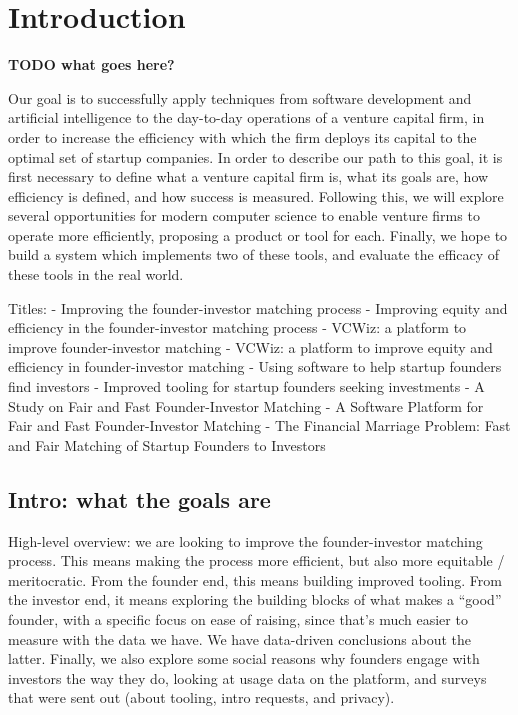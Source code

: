 \chapter{Introduction}

\textbf{TODO what goes here?}

Our goal is to successfully apply techniques from software development and artificial intelligence to the day-to-day operations of a venture capital firm, in order to increase the efficiency with which the firm deploys its capital to the optimal set of startup companies. In order to describe our path to this goal, it is first necessary to define what a venture capital firm is, what its goals are, how efficiency is defined, and how success is measured. Following this, we will explore several opportunities for modern computer science to enable venture firms to operate more efficiently, proposing a product or tool for each. Finally, we hope to build a system which implements two of these tools, and evaluate the efficacy of these tools in the real world.


Titles:
  - Improving the founder-investor matching process
  - Improving equity and efficiency in the founder-investor matching process
  - VCWiz: a platform to improve founder-investor matching
  - VCWiz: a platform to improve equity and efficiency in founder-investor matching
  - Using software to help startup founders find investors
  - Improved tooling for startup founders seeking investments
  - A Study on Fair and Fast Founder-Investor Matching
  - A Software Platform for Fair and Fast Founder-Investor Matching
  - The Financial Marriage Problem: Fast and Fair Matching of Startup Founders to Investors

\section{Intro: what the goals are}

High-level overview: we are looking to improve the founder-investor matching process. This means making the process more efficient, but also more equitable / meritocratic. From the founder end, this means building improved tooling. From the investor end, it means exploring the building blocks of what makes a ``good'' founder, with a specific focus on ease of raising, since that's much easier to measure with the data we have. We have data-driven conclusions about the latter. Finally, we also explore some social reasons why founders engage with investors the way they do, looking at usage data on the platform, and surveys that were sent out (about tooling, intro requests, and privacy).

